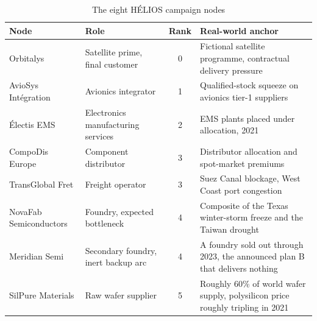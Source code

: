 \begin{table}[htbp]
\centering
\caption{The eight H\'ELIOS campaign nodes}
\label{tab:helios_network}
\small
\begin{tabularx}{\linewidth}{>{\raggedright\arraybackslash}p{3.1cm} >{\raggedright\arraybackslash}p{2.6cm} c X}
\toprule
\textbf{Node} & \textbf{Role} & \textbf{Rank} & \textbf{Real-world anchor} \\
\midrule
Orbitalys & Satellite prime, final customer & 0 & Fictional satellite programme,
contractual delivery pressure \\
AvioSys Int\'egration & Avionics integrator & 1 & Qualified-stock squeeze on avionics
tier-1 suppliers \\
\'Electis EMS & Electronics manufacturing services & 2 & EMS plants placed under
allocation, 2021 \\
CompoDis Europe & Component distributor & 3 & Distributor allocation and spot-market
premiums \\
TransGlobal Fret & Freight operator & 3 & Suez Canal blockage, West Coast port
congestion \\
NovaFab Semiconductors & Foundry, expected bottleneck & 4 & Composite of the Texas
winter-storm freeze and the Taiwan drought \\
Meridian Semi & Secondary foundry, inert backup arc & 4 & A foundry sold out through 2023,
the announced plan B that delivers nothing \\
SilPure Materials & Raw wafer supplier & 5 & Roughly 60\% of world wafer supply,
polysilicon price roughly tripling in 2021 \\
\bottomrule
\end{tabularx}
\end{table}

